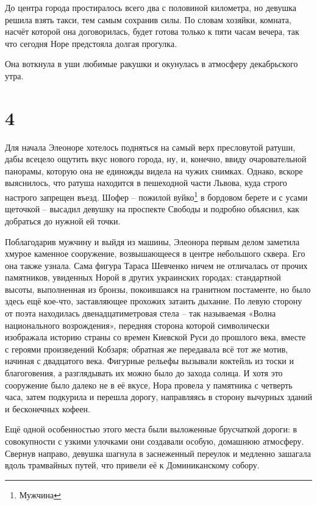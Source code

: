 \documentclass[
  a5paperpaper,
  DIV=11,
  numbers=noendperiod]{scrreprt}
\begin{document}
До центра города простиралось всего два с половиной километра, но
девушка решила взять такси, тем самым сохранив силы. По словам хозяйки,
комната, насчёт которой она договорилась, будет готова только к пяти
часам вечера, так что сегодня Норе предстояла долгая прогулка.

Она воткнула в уши любимые ракушки и окунулась в атмосферу декабрьского
утра.

\section*{4}\label{4}


Для начала Элеоноре хотелось подняться на самый верх пресловутой ратуши,
дабы всецело ощутить вкус нового города, ну, и, конечно, ввиду
очаровательной панорамы, которую она не единожды видела на чужих
снимках. Однако, вскоре выяснилось, что ратуша находится в пешеходной
части Львова, куда строго настрого запрещен въезд. Шофер -- пожилой
вуйко\footnote{Мужчина} в бордовом берете и с усами щеточкой -- высадил
девушку на проспекте Свободы и подробно объяснил, как добраться до
нужной ей точки.

Поблагодарив мужчину и выйдя из машины, Элеонора первым делом заметила
хмурое каменное сооружение, возвышающееся в центре небольшого сквера.
Его она также узнала. Сама фигура Тараса Шевченко ничем не отличалась от
прочих памятников, увиденных Норой в других украинских городах:
стандартной высоты, выполненная из бронзы, покоившаяся на гранитном
постаменте, но было здесь ещё кое-что, заставляющее прохожих затаить
дыхание. По левую сторону от поэта находилась двенадцатиметровая стела
-- так называемая «Волна национального возрождения», передняя сторона
которой символически изображала историю страны со времен Киевской Руси
до прошлого века, вместе с героями произведений Кобзаря; обратная же
передавала всё тот же мотив, начиная с двадцатого века. Фигурные рельефы
вызывали коктейль из тоски и благоговения, а разглядывать их можно было
до захода солнца. И хотя это сооружение было далеко не в её вкусе, Нора
провела у памятника с четверть часа, затем подкурила и перешла дорогу,
направляясь в сторону вычурных зданий и бесконечных кофеен.

Ещё одной особенностью этого места были выложенные брусчаткой дороги: в
совокупности с узкими улочками они создавали особую, домашнюю атмосферу.
Свернув направо, девушка шагнула в заснеженный переулок и медленно
зашагала вдоль трамвайных путей, что привели её к Доминиканскому собору.
\end{document}
